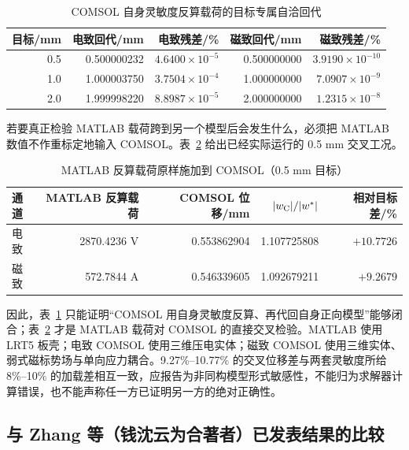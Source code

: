 \documentclass[UTF8,fontset=windows,11pt,a4paper]{ctexart}
\begin{document}
\begin{table}[H]
\centering
\caption{COMSOL 自身灵敏度反算载荷的目标专属自洽回代}
\label{tab:inverse_actuation_return}
\scriptsize
\begin{tabular}{rrrrr}
\toprule
目标/mm & 电致回代/mm & 电致残差/\% & 磁致回代/mm & 磁致残差/\% \\
\midrule
0.5 & 0.500000232 & $4.6400\times10^{-5}$ & 0.500000000 & $3.9190\times10^{-10}$ \\
1.0 & 1.000003750 & $3.7504\times10^{-4}$ & 1.000000000 & $7.0907\times10^{-9}$ \\
2.0 & 1.999998220 & $8.8987\times10^{-5}$ & 2.000000000 & $1.2315\times10^{-8}$ \\
\bottomrule
\end{tabular}
\end{table}

若要真正检验 MATLAB 载荷跨到另一个模型后会发生什么，必须把 MATLAB 数值不作重标定地输入 COMSOL。表~\ref{tab:inverse_actuation_crossapply} 给出已经实际运行的 0.5 mm 交叉工况。

\begin{table}[H]
\centering
\caption{MATLAB 反算载荷原样施加到 COMSOL（0.5 mm 目标）}
\label{tab:inverse_actuation_crossapply}
\scriptsize
\begin{tabular}{lrrrr}
\toprule
通道 & MATLAB 反算载荷 & COMSOL 位移/mm & $|w_{\rm C}|/|w^*|$ & 相对目标差/\% \\
\midrule
电致 & 2870.4236 V & 0.553862904 & 1.107725808 & $+10.7726$ \\
磁致 & 572.7844 A & 0.546339605 & 1.092679211 & $+9.2679$ \\
\bottomrule
\end{tabular}
\end{table}

因此，表~\ref{tab:inverse_actuation_return} 只能证明“COMSOL 用自身灵敏度反算、再代回自身正向模型”能够闭合；表~\ref{tab:inverse_actuation_crossapply} 才是 MATLAB 载荷对 COMSOL 的直接交叉检验。MATLAB 使用 LRT5 板壳；电致 COMSOL 使用三维压电实体；磁致 COMSOL 使用三维实体、弱式磁标势场与单向应力耦合。9.27\%--10.77\% 的交叉位移差与两套灵敏度所给 8\%--10\% 的加载差相互一致，应报告为非同构模型形式敏感性，不能归为求解器计算错误，也不能声称任一方已证明另一方的绝对正确性。

\subsection{与 Zhang 等（钱沈云为合著者）已发表结果的比较}
\end{document}
